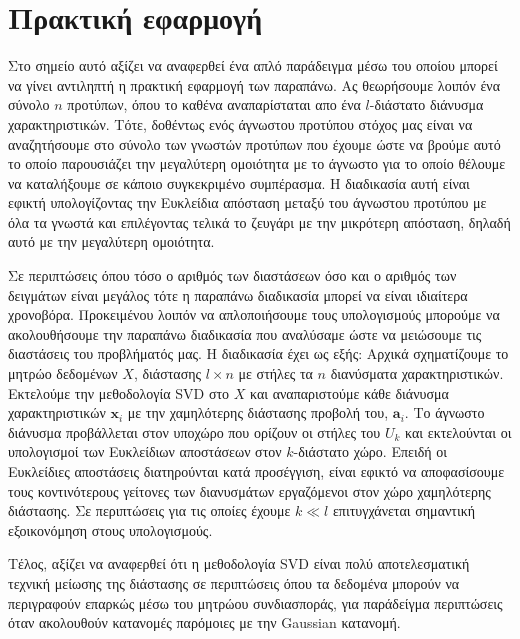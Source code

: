\section{Πρακτική εφαρμογή}
\par
Στο σημείο αυτό αξίζει να αναφερθεί ένα απλό παράδειγμα μέσω του οποίου μπορεί να γίνει αντιληπτή η πρακτική εφαρμογή των παραπάνω. Ας θεωρήσουμε λοιπόν ένα σύνολο $n$ προτύπων, όπου το καθένα αναπαρίσταται απο ένα $l$-διάστατο διάνυσμα χαρακτηριστικών. Τότε, δοθέντως ενός άγνωστου προτύπου στόχος μας είναι να αναζητήσουμε στο σύνολο των γνωστών προτύπων που έχουμε ώστε να βρούμε αυτό το οποίο παρουσιάζει την μεγαλύτερη ομοιότητα με το άγνωστο για το οποίο θέλουμε να καταλήξουμε σε κάποιο συγκεκριμένο συμπέρασμα. Η διαδικασία αυτή είναι εφικτή υπολογίζοντας την Ευκλείδια απόσταση μεταξύ του άγνωστου προτύπου με όλα τα γνωστά και επιλέγοντας τελικά το ζευγάρι με την μικρότερη απόσταση, δηλαδή αυτό με την μεγαλύτερη ομοιότητα.
\par
Σε περιπτώσεις όπου τόσο ο αριθμός των διαστάσεων όσο και ο αριθμός των δειγμάτων είναι μεγάλος τότε η παραπάνω διαδικασία μπορεί να είναι ιδιαίτερα χρονοβόρα. Προκειμένου λοιπόν να απλοποιήσουμε τους υπολογισμούς μπορούμε να ακολουθήσουμε την παραπάνω διαδικασία που αναλύσαμε ώστε να μειώσουμε τις διαστάσεις του προβλήματός μας. Η διαδικασία έχει ως εξής: Αρχικά σχηματίζουμε το μητρώο δεδομένων $X$, διάστασης $ l \times n $ με στήλες τα $n$ διανύσματα χαρακτηριστικών. Εκτελούμε την μεθοδολογία \textlatin{SVD} στο $X$ και αναπαριστούμε κάθε διάνυσμα χαρακτηριστικών $ \mathbf{x}_{i} $ με την χαμηλότερης διάστασης προβολή του, $ \mathbf{a}_{i} $. Το άγνωστο διάνυσμα προβάλλεται στον υποχώρο που ορίζουν οι στήλες του $U_{k}$ και εκτελούνται οι υπολογισμοί των Ευκλείδιων αποστάσεων στον $k$-διάστατο χώρο. Επειδή οι Ευκλείδιες αποστάσεις διατηρούνται κατά προσέγγιση, είναι εφικτό να αποφασίσουμε τους κοντινότερους γείτονες των διανυσμάτων εργαζόμενοι στον χώρο χαμηλότερης διάστασης. Σε περιπτώσεις για τις οποίες έχουμε $k \ll l$ επιτυγχάνεται σημαντική εξοικονόμηση στους υπολογισμούς.
\par
Τέλος, αξίζει να αναφερθεί ότι η μεθοδολογία \textlatin{SVD} είναι πολύ αποτελεσματική τεχνική μείωσης της διάστασης  σε περιπτώσεις όπου τα δεδομένα μπορούν να περιγραφούν επαρκώς μέσω του μητρώου συνδιασποράς, για παράδείγμα περιπτώσεις όταν ακολουθούν κατανομές παρόμοιες με την \textlatin{Gaussian} κατανομή.



